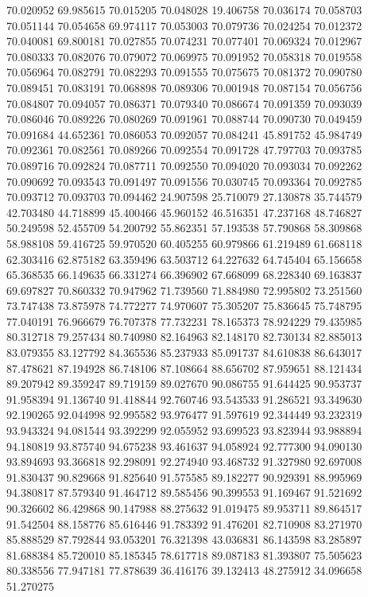 70.020952
69.985615
70.015205
70.048028
19.406758
70.036174
70.058703
70.051144
70.054658
69.974117
70.053003
70.079736
70.024254
70.012372
70.040081
69.800181
70.027855
70.074231
70.077401
70.069324
70.012967
70.080333
70.082076
70.079072
70.069975
70.091952
70.058318
70.019558
70.056964
70.082791
70.082293
70.091555
70.075675
70.081372
70.090780
70.089451
70.083191
70.068898
70.089306
70.001948
70.087154
70.056756
70.084807
70.094057
70.086371
70.079340
70.086674
70.091359
70.093039
70.086046
70.089226
70.080269
70.091961
70.088744
70.090730
70.049459
70.091684
44.652361
70.086053
70.092057
70.084241
45.891752
45.984749
70.092361
70.082561
70.089266
70.092554
70.091728
47.797703
70.093785
70.089716
70.092824
70.087711
70.092550
70.094020
70.093034
70.092262
70.090692
70.093543
70.091497
70.091556
70.030745
70.093364
70.092785
70.093712
70.093703
70.094462
24.907598
25.710079
27.130878
35.744579
42.703480
44.718899
45.400466
45.960152
46.516351
47.237168
48.746827
50.249598
52.455709
54.200792
55.862351
57.193538
57.790868
58.309868
58.988108
59.416725
59.970520
60.405255
60.979866
61.219489
61.668118
62.303416
62.875182
63.359496
63.503712
64.227632
64.745404
65.156658
65.368535
66.149635
66.331274
66.396902
67.668099
68.228340
69.163837
69.697827
70.860332
70.947962
71.739560
71.884980
72.995802
73.251560
73.747438
73.875978
74.772277
74.970607
75.305207
75.836645
75.748795
77.040191
76.966679
76.707378
77.732231
78.165373
78.924229
79.435985
80.312718
79.257434
80.740980
82.164963
82.148170
82.730134
82.885013
83.079355
83.127792
84.365536
85.237933
85.091737
84.610838
86.643017
87.478621
87.194928
86.748106
87.108664
88.656702
87.959651
88.121434
89.207942
89.359247
89.719159
89.027670
90.086755
91.644425
90.953737
91.958394
91.136740
91.418844
92.760746
93.543533
91.286521
93.349630
92.190265
92.044998
92.995582
93.976477
91.597619
92.344449
93.232319
93.943324
94.081544
93.392299
92.055952
93.699523
93.823944
93.988894
94.180819
93.875740
94.675238
93.461637
94.058924
92.777300
94.090130
93.894693
93.366818
92.298091
92.274940
93.468732
91.327980
92.697008
91.830437
90.829668
91.825640
91.575585
89.182277
90.929391
88.995969
94.380817
87.579340
91.464712
89.585456
90.399553
91.169467
91.521692
90.326602
86.429868
90.147988
88.275632
91.019475
89.953711
89.864517
91.542504
88.158776
85.616446
91.783392
91.476201
82.710908
83.271970
85.888529
87.792844
93.053201
76.321398
43.036831
86.143598
83.285897
81.688384
85.720010
85.185345
78.617718
89.087183
81.393807
75.505623
80.338556
77.947181
77.878639
36.416176
39.132413
48.275912
34.096658
51.270275
